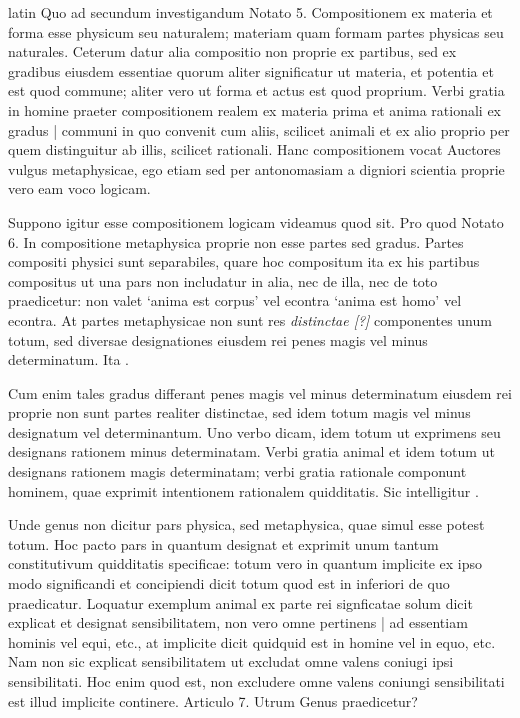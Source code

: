\begin{otherlanguage*}{latin}
\pstart
Quo ad secundum investigandum Notato 5. Compositionem ex materia et forma esse physicum seu naturalem; materiam quam formam partes physicas seu naturales. Ceterum datur alia compositio non proprie ex partibus, sed ex gradibus eiusdem essentiae quorum aliter significatur ut materia, et potentia et est quod commune; aliter vero ut forma et actus est quod proprium. Verbi gratia in homine praeter compositionem realem ex materia prima et anima rationali ex gradus \textnormal{|} communi in quo convenit cum aliis, scilicet animali et ex alio proprio per quem distinguitur ab illis, scilicet rationali. Hanc compositionem vocat Auctores vulgus metaphysicae, ego etiam sed per antonomasiam a digniori scientia proprie vero eam voco logicam. 
\pend

\pstart
Suppono igitur esse compositionem logicam videamus quod sit. Pro quod Notato 6. In compositione metaphysica proprie non esse partes sed gradus. Partes compositi physici sunt separabiles, quare hoc compositum ita ex his partibus compositus ut una pars non includatur in alia, nec de illa, nec de toto praedicetur:
non valet `anima est corpus' vel econtra `anima est homo' vel econtra. At partes metaphysicae non sunt  res \emph{distinctae [?]} componentes unum totum, sed diversae designationes eiusdem rei penes magis vel minus determinatum. Ita . 
\pend

\pstart
Cum enim tales gradus differant penes magis vel minus determinatum eiusdem rei proprie non sunt partes realiter distinctae, sed idem totum magis vel minus designatum vel determinantum. Uno verbo dicam, idem totum ut exprimens seu designans rationem minus determinatam. Verbi gratia animal et idem totum ut designans rationem magis determinatam; verbi gratia rationale componunt hominem, quae exprimit intentionem rationalem quidditatis. Sic intelligitur . 
\pend

\pstart
Unde genus non dicitur pars physica, sed metaphysica, quae simul esse potest totum. Hoc pacto pars in quantum designat et exprimit unum tantum constitutivum quidditatis specificae:
totum vero in quantum implicite ex ipso modo significandi et concipiendi dicit totum quod est in inferiori de quo praedicatur. Loquatur exemplum animal ex parte rei signficatae solum dicit explicat et designat sensibilitatem, non vero omne pertinens \textnormal{|} ad essentiam hominis vel equi, etc., at implicite dicit quidquid est in homine vel in equo, etc. Nam non sic explicat sensibilitatem ut excludat omne valens coniugi ipsi sensibilitati. Hoc enim quod est, non excludere omne valens coniungi sensibilitati est illud implicite continere. Articulo 7. Utrum Genus praedicetur? 
\pend


\end{otherlanguage*}
